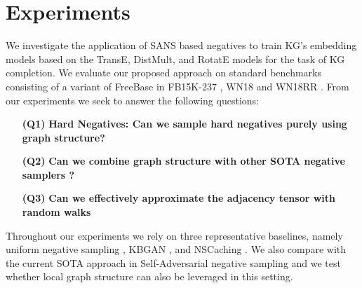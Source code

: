 \section{Experiments}
\label{sec:results}




We investigate the application of SANS based negatives to train KG's embedding models based on  the TransE, DistMult, and RotatE models for the task of KG completion. We evaluate our proposed approach on standard benchmarks consisting of a variant of FreeBase in FB15K-237 \cite{bollacker2008freebase}, WN18 and WN18RR \cite{miller1995wordnet}. From our experiments we seek to answer the following questions: 
\begin{itemize}
    \item[\textbf{(Q1)}] \textbf{Hard Negatives: Can we sample hard negatives purely using graph structure?} 
    \item[\textbf{(Q2)}] \textbf{Can we combine graph structure with other SOTA negative samplers ?} 
    \item[\textbf{(Q3)}] \textbf{Can we effectively approximate the adjacency tensor with random walks} 
\end{itemize}
Throughout our experiments we rely on three representative baselines, namely uniform negative sampling \cite{bordes2013translating}, KBGAN \cite{cai2017kbgan}, and NSCaching \cite{zhang2019nscaching}. We also compare with the current SOTA approach in Self-Adversarial negative sampling \cite{sun2019rotate} and we test whether local graph structure can also be leveraged in this setting. 

